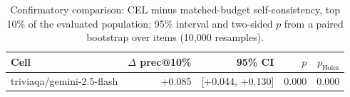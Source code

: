 \begin{table}[t]
\centering
\small
\begin{tabular}{lrrrr}
\toprule
Cell & $\Delta$ prec@10\% & 95\% CI & $p$ & $p_{\mathrm{Holm}}$ \\
\midrule
triviaqa/gemini-2.5-flash & +0.085 & [+0.044, +0.130] & 0.000 & 0.000 \\
\bottomrule
\end{tabular}
\caption{Confirmatory comparison: CEL minus matched-budget self-consistency, top 10\% of the evaluated population; 95\% interval and two-sided $p$ from a paired bootstrap over items (10,000 resamples).}
\label{tab:confirmatory}
\end{table}
